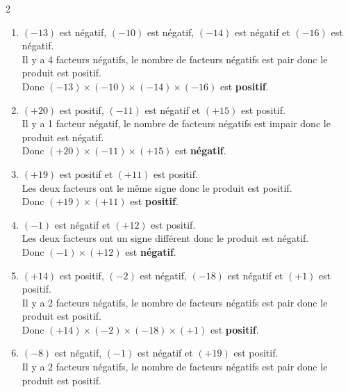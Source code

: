 \begin{corrige}
    \phantom{rrr}    
    \begin{multicols}2
        \begin{enumerate}
            \item $ (-13) $ est négatif, $ (-10) $ est négatif, $ (-14) $ est négatif et $ (-16) $ est négatif.\\
            Il y a 4 facteurs négatifs, le nombre de facteurs négatifs est pair donc le produit est positif.\\
           Donc $ (-13) \times (-10) \times (-14) \times (-16) $ est {\bfseries \color[HTML]{f15929}positif}.
               \item $ (+20) $ est positif, $ (-11) $ est négatif et $ (+15) $ est positif.\\
            Il y a 1 facteur négatif, le nombre de facteurs négatifs est impair donc le produit est négatif.\\
           Donc $ (+20) \times (-11) \times (+15) $ est {\bfseries \color[HTML]{f15929}négatif}.
               \item $ (+19) $ est positif et $ (+11) $ est positif.\\
            Les deux facteurs ont le même signe donc le produit est positif.\\
           Donc $ (+19) \times (+11) $ est {\bfseries \color[HTML]{f15929}positif}.
               \item $ (-1) $ est négatif et $ (+12) $ est positif.\\
            Les deux facteurs ont un signe différent donc le produit est négatif.\\
           Donc $ (-1) \times (+12) $ est {\bfseries \color[HTML]{f15929}négatif}.
               \item $ (+14) $ est positif, $ (-2) $ est négatif, $ (-18) $ est négatif et $ (+1) $ est positif.\\
            Il y a 2 facteurs négatifs, le nombre de facteurs négatifs est pair donc le produit est positif.\\
           Donc $ (+14) \times (-2) \times (-18) \times (+1) $ est {\bfseries \color[HTML]{f15929}positif}.
               \item $ (-8) $ est négatif, $ (-1) $ est négatif et $ (+19) $ est positif.\\
            Il y a 2 facteurs négatifs, le nombre de facteurs négatifs est pair donc le produit est positif.\\

\end{enumerate}
\end{multicols}
\end{corrige}
